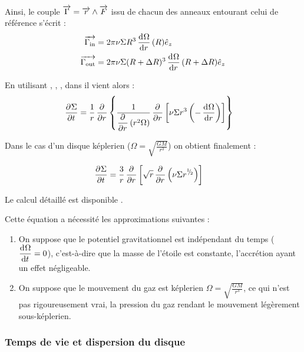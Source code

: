 \bigskip

Ainsi, le couple ${\overrightarrow{\Gamma}}={\overrightarrow{r}}\wedge{\overrightarrow{F}}$ issu de chacun des anneaux entourant celui de référence s'écrit :
\begin{subequations}
\begin{align}
{\overrightarrow{\Gamma_\text{in}}} &= 2\pi\nu \Sigma R^3 \mathinner{ \dfrac{\operatorname{d \!}{^{}}\Omega}{\operatorname{d \!}{{r}^{}}} }(R) \hat{e}_z\label{eq:G_in}\\
{\overrightarrow{\Gamma_\text{out}}} &= 2\pi\nu \Sigma (R+\Delta R)^3 \mathinner{ \dfrac{\operatorname{d \!}{^{}}\Omega}{\operatorname{d \!}{{r}^{}}} }(R+\Delta R) \hat{e}_z\label{eq:G_out}
\end{align}\label{eq:J_torques}
\end{subequations}

\bigskip

En utilisant , , , dans  il vient alors :
\begin{align}
\mathinner{ \dfrac{\partial{^{}}\Sigma}{\partial{{t}^{}}} } &= \frac{1}{r}\mathinner{ \dfrac{\partial{^{}}}{\partial{{r}^{}}} }\left\{\frac{1}{\mathinner{ \dfrac{\partial{^{}}}{\partial{{r}^{}}} }\left(r^2\Omega\right)} \mathinner{ \dfrac{\partial{^{}}}{\partial{{r}^{}}} }\left[\nu \Sigma r^3 \left(-\mathinner{ \dfrac{\operatorname{d \!}{^{}}\Omega}{\operatorname{d \!}{{r}^{}}} }\right)\right]\right\}
\end{align}

Dans le cas d'un disque képlerien ($\Omega = \sqrt{\frac{GM}{r^3}}$) on obtient finalement :
\begin{important}
\begin{align}
\mathinner{ \dfrac{\partial{^{}}\Sigma}{\partial{{t}^{}}} } &=\frac{3}{r}\mathinner{ \dfrac{\partial{^{}}}{\partial{{r}^{}}} }\left[\sqrt{r} \mathinner{ \dfrac{\partial{^{}}}{\partial{{r}^{}}} }\left(\nu \Sigma r^{{}^{1\!\!}/ _{\!2}}\right)\right]
\end{align}
\end{important}

Le calcul détaillé est disponible .

Cette équation a nécessité les approximations suivantes : 
\begin{enumerate}
\item On suppose que le potentiel gravitationnel est indépendant du temps ($\mathinner{ \dfrac{\operatorname{d \!}{^{}}\Omega}{\operatorname{d \!}{{t}^{}}} }=0$), c'est-à-dire que la masse de l'étoile est constante, l'accrétion ayant un effet négligeable.
\item On suppose que le mouvement du gaz est képlerien $\Omega=\sqrt{\frac{GM}{r^3}}$, ce qui n'est pas rigoureusement vrai, la pression du gaz rendant le mouvement légèrement sous-képlerien.
\end{enumerate}

\subsubsection{Temps de vie et dispersion du disque}\label{sec:dispersion}

